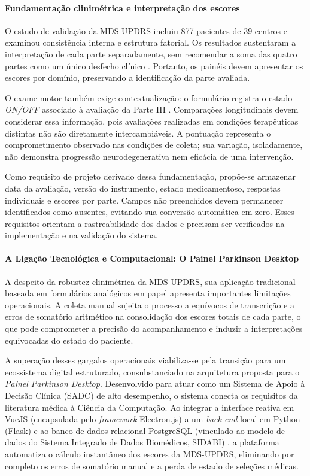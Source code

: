 \paragraph{Fundamentação clinimétrica e interpretação dos escores}
O estudo de validação da MDS-UPDRS incluiu 877 pacientes de 39 centros e examinou consistência interna e estrutura fatorial. Os resultados sustentaram a interpretação de cada parte separadamente, sem recomendar a soma das quatro partes como um único desfecho clínico \cite{Goetz2008}. Portanto, os painéis devem apresentar os escores por domínio, preservando a identificação da parte avaliada.

O exame motor também exige contextualização: o formulário registra o estado \textit{ON/OFF} associado à avaliação da Parte III \cite{Goetz2008}. Comparações longitudinais devem considerar essa informação, pois avaliações realizadas em condições terapêuticas distintas não são diretamente intercambiáveis. A pontuação representa o comprometimento observado nas condições de coleta; sua variação, isoladamente, não demonstra progressão neurodegenerativa nem eficácia de uma intervenção.

Como requisito de projeto derivado dessa fundamentação, propõe-se armazenar data da avaliação, versão do instrumento, estado medicamentoso, respostas individuais e escores por parte. Campos não preenchidos devem permanecer identificados como ausentes, evitando sua conversão automática em zero. Esses requisitos orientam a rastreabilidade dos dados e precisam ser verificados na implementação e na validação do sistema.

\paragraph{A Ligação Tecnológica e Computacional: O Painel Parkinson Desktop} 
A despeito da robustez clinimétrica da MDS-UPDRS, sua aplicação tradicional baseada em formulários analógicos em papel apresenta importantes limitações operacionais. A coleta manual sujeita o processo a equívocos de transcrição e a erros de somatório aritmético na consolidação dos escores totais de cada parte, o que pode comprometer a precisão do acompanhamento e induzir a interpretações equivocadas do estado do paciente. 

A superação desses gargalos operacionais viabiliza-se pela transição para um ecossistema digital estruturado, consubstanciado na arquitetura proposta para o \textit{Painel Parkinson Desktop}. Desenvolvido para atuar como um Sistema de Apoio à Decisão Clínica (SADC) de alto desempenho, o sistema conecta os requisitos da literatura médica à Ciência da Computação. Ao integrar a interface reativa em VueJS (encapsulada pelo \textit{framework} Electron.js) a um \textit{back-end} local em Python (Flask) e ao banco de dados relacional PostgreSQL (vinculado ao modelo de dados do Sistema Integrado de Dados Biomédicos, SIDABI) \cite{folador2021}, a plataforma automatiza o cálculo instantâneo dos escores da MDS-UPDRS, eliminando por completo os erros de somatório manual e a perda de estado de seleções médicas. 

